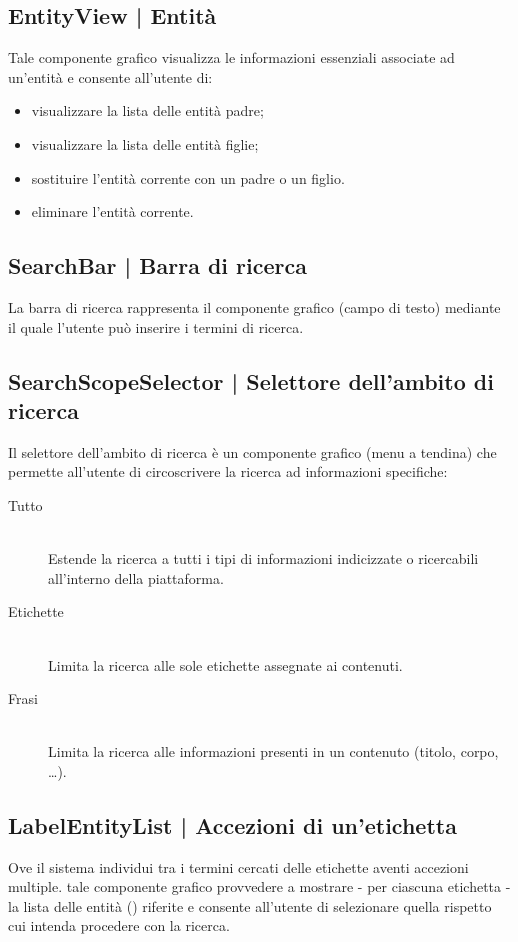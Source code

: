 \documentclass[10pt,a4paper,headinclude,footinclude,hidelinks]{scrreprt} %
\begin{document}
	\subsection[EntityView]{EntityView | Entità}
	\label{sec:stage:design:sistema:view.search:entity}
	Tale componente grafico visualizza le informazioni essenziali associate ad un'entità e consente all'utente di:
	\begin{itemize}
	\item visualizzare la lista delle entità padre;
	\item visualizzare la lista delle entità figlie;
	\item sostituire l'entità corrente con un padre o un figlio.
	\item eliminare l'entità corrente.
	\end{itemize}

	\subsection[SearchBar]{SearchBar | Barra di ricerca}
	\label{sec:stage:design:sistema:view.search:search-bar}
	La barra di ricerca rappresenta il componente grafico (campo di testo) mediante il quale l'utente può inserire i termini di ricerca.

	\subsection[SearchScopeSelector]{SearchScopeSelector | Selettore dell'ambito di ricerca}
	\label{sec:stage:design:sistema:view.search:search-scope-selector}
	Il selettore dell'ambito di ricerca è un componente grafico (menu a tendina) che permette all'utente di circoscrivere la ricerca ad informazioni specifiche:
	\begin{description}
	\item[Tutto] \hfill \\
	Estende la ricerca a tutti i tipi di informazioni indicizzate o ricercabili all'interno della piattaforma.
 	\item[Etichette] \hfill \\
	Limita la ricerca alle sole etichette assegnate ai contenuti.
	\item[Frasi] \hfill \\
	Limita la ricerca alle informazioni presenti in un contenuto (titolo, corpo, \ldots).
	\end{description}

	\subsection[LabelEntityList]{LabelEntityList | Accezioni di un'etichetta}
	\label{sec:stage:design:sistema:view.search:label-entity-list}
	Ove il sistema individui tra i termini cercati delle etichette aventi accezioni multiple. tale componente grafico provvedere a mostrare - per ciascuna etichetta - la lista delle entità (\textit{}) riferite e consente all'utente di selezionare quella rispetto cui intenda procedere con la ricerca.
\end{document}
